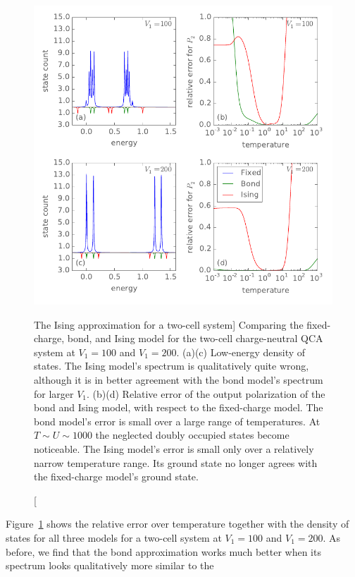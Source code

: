 %
\begin{figure}
  \center
  \includegraphics{ising_approximation2}
  \caption
  [The Ising approximation for a two-cell system]
  {
  Comparing the fixed-charge, bond, and Ising model for the two-cell
  charge-neutral QCA system at $V_1 = 100$ and $V_1 = 200$. (a)(c) Low-energy
  density of states. The Ising model's spectrum is qualitatively quite wrong,
  although it is in better agreement with the bond model's spectrum for larger
  $V_1$. (b)(d) Relative error of the output polarization of the bond and Ising
  model, with respect to the fixed-charge model. The bond model's error is small
  over a large range of temperatures. At $T \sim U \sim 1000$ the neglected
  doubly occupied states become noticeable. The Ising model's error is small
  only over a relatively narrow temperature range. Its ground state no longer
  agrees with the fixed-charge model's ground state.
  }
  \label{fig:ising_approximation2}
\end{figure}
%
Figure~\ref{fig:ising_approximation2} shows the relative error over temperature
together with the density of states for all three models for a two-cell system
at $V_1 = 100$ and $V_1 = 200$. As before, we find that the bond approximation
works much better when its spectrum looks qualitatively more similar to the
